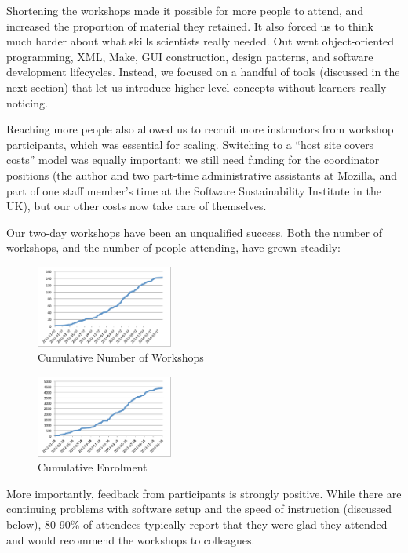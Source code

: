 \documentclass[10pt,a4paper,twocolumn]{article}
\begin{document}
Shortening the workshops made it possible for more people to attend,
and increased the proportion of material they retained. It also forced
us to think much harder about what skills scientists really
needed. Out went object-oriented programming, XML, Make, GUI
construction, design patterns, and software development
lifecycles. Instead, we focused on a handful of tools (discussed in
the next section) that let us introduce higher-level concepts without
learners really noticing.

Reaching more people also allowed us to recruit more instructors from
workshop participants, which was essential for scaling. Switching to a
``host site covers costs'' model was equally important: we still need
funding for the coordinator positions (the author and two part-time
administrative assistants at Mozilla, and part of one staff member's
time at the Software Sustainability Institute in the UK), but our
other costs now take care of themselves.

Our two-day workshops have been an unqualified success. Both the number
of workshops, and the number of people attending, have grown steadily:

\begin{figure}
\centering
\includegraphics[width=0.4\textwidth]{workshops.pdf}
\caption{\label{f:workshops}Cumulative Number of Workshops}
\end{figure}

\begin{figure}
\centering
\includegraphics[width=0.4\textwidth]{enrolment.pdf}
\caption{\label{f:enrolment}Cumulative Enrolment}
\end{figure}

More importantly, feedback from participants is strongly positive. While
there are continuing problems with software setup and the speed of
instruction (discussed below), 80-90\% of attendees typically report
that they were glad they attended and would recommend the workshops to
colleagues.
\end{document}
